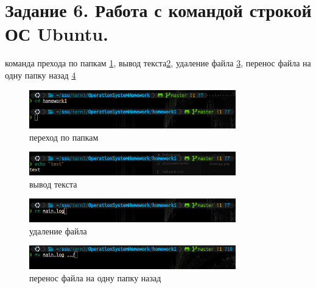 \section{Задание 6. Работа с командой строкой ОС Ubuntu.}

команда прехода по папкам \ref{fig:comandCD}, вывод текста\ref{fig:comandECHO}, удаление файла \ref{fig:comandRM}, перенос файла на одну папку назад \ref{fig:comandMV}

\begin{figure}[!h]
    \centering
    \includegraphics[width = 0.8\textwidth]{images/comandCD.png}
    
    \caption{переход по папкам}
    
    \label{fig:comandCD}
\end{figure}

\begin{figure}[!h]
    \centering
    \includegraphics[width = 0.8\textwidth]{images/comandECHO.png}
    
    \caption{вывод текста}
    
    \label{fig:comandECHO}
\end{figure}

\begin{figure}[!h]
    \centering
    \includegraphics[width = 0.8\textwidth]{images/comandRM.png}
    
    \caption{удаление файла}
    
    \label{fig:comandRM}
\end{figure}

\begin{figure}[!h]
    \centering
    \includegraphics[width = 0.8\textwidth]{images/comandMV.png}
    
    \caption{перенос файла на одну папку назад}
    
    \label{fig:comandMV}
\end{figure}
